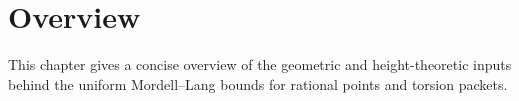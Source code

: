 \chapter{Overview}
\label{chap:overview}

This chapter gives a concise overview of the geometric and height-theoretic
inputs behind the uniform Mordell--Lang bounds for rational points and torsion
packets.
